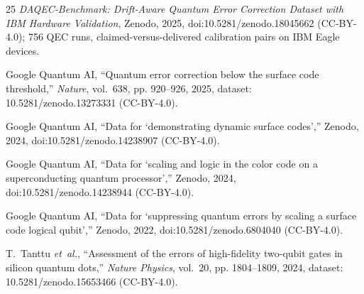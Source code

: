 \documentclass[journal]{IEEEtran}
\begin{document}
\begin{thebibliography}{25}
\emph{{DAQEC-Benchmark}: Drift-Aware Quantum Error Correction Dataset with
  {IBM} Hardware Validation}, Zenodo, 2025, doi:10.5281/zenodo.18045662
  (CC-BY-4.0); 756 QEC runs, claimed-versus-delivered calibration pairs on
  {IBM} {E}agle devices.

{Google Quantum AI}, ``Quantum error correction below the surface code
  threshold,'' \emph{Nature}, vol.~638, pp. 920--926, 2025, dataset:
  10.5281/zenodo.13273331 (CC-BY-4.0).

{Google Quantum AI}, ``Data for `demonstrating dynamic surface codes','' Zenodo,
  2024, doi:10.5281/zenodo.14238907 (CC-BY-4.0).

{Google Quantum AI}, ``Data for `scaling and logic in the color code on a
  superconducting quantum processor','' Zenodo, 2024,
  doi:10.5281/zenodo.14238944 (CC-BY-4.0).

{Google Quantum AI}, ``Data for `suppressing quantum errors by scaling a surface
  code logical qubit','' Zenodo, 2022, doi:10.5281/zenodo.6804040 (CC-BY-4.0).

T.~Tanttu \emph{et~al.}, ``Assessment of the errors of high-fidelity two-qubit
  gates in silicon quantum dots,'' \emph{Nature Physics}, vol.~20, pp.
  1804--1809, 2024, dataset: 10.5281/zenodo.15653466 (CC-BY-4.0).

\end{thebibliography}

%
%
\end{document}
